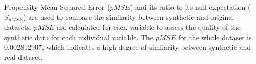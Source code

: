 \documentclass[a0,portrait]{a0poster}
\begin{document}
\begin{multicols}{3}
Propensity Mean Squared Error ($pMSE$) and its ratio to its null expectation ($S_{pMSE}$) are used to compare the similarity between synthetic and original datasets. $pMSE$ are calculated for each variable to assess the quality of the synthetic data for each individual variable. 
The $pMSE$ for the whole dataset is 0.002812907, which indicates a high degree of similarity between synthetic and real dataset.








\end{multicols}
\end{document}
